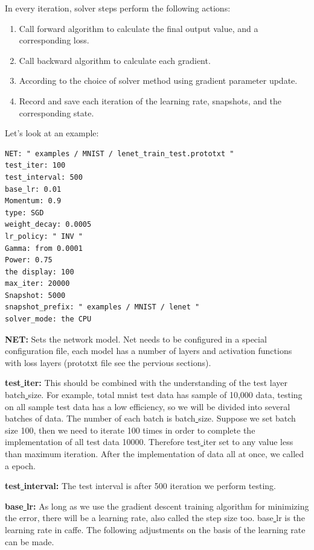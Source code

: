 \documentclass[12pt]{article}
\begin{document}
\noindent In every iteration, solver steps perform the following actions:
\begin{enumerate}
  \item Call forward algorithm to calculate the final output value, and a corresponding loss.
  \item Call backward algorithm to calculate each gradient.
  \item According to the choice of solver method using gradient parameter update.
  \item Record and save each iteration of the learning rate, snapshots, and the corresponding state.
\end{enumerate}


\noindent Let's look at an example:


\begin{lstlisting}[style=json, frame=single]
NET: " examples / MNIST / lenet_train_test.prototxt "
test_iter: 100
test_interval: 500
base_lr: 0.01
Momentum: 0.9
type: SGD
weight_decay: 0.0005
lr_policy: " INV "
Gamma: from 0.0001
Power: 0.75
the display: 100
max_iter: 20000
Snapshot: 5000
snapshot_prefix: " examples / MNIST / lenet "
solver_mode: the CPU
\end{lstlisting}

\noindent\textbf{NET:} Sets the network model. Net needs to be configured in a special configuration file, each model has a number of layers and activation functions with loss layers (prototxt file see the pervious sections).

\noindent\textbf{test\underline{{ }{ }}iter:} This should be combined with the understanding of the test layer batch\underline{{ }{ }}size. For example, total mnist test data has sample of 10,000 data, testing on all sample test data has a low efficiency, so we will be divided into several batches of data. The number of each batch is batch\underline{{ }{ }}size. Suppose we set batch\underline{{ }{ }}size 100, then we need to iterate 100 times in order to complete the implementation of all test data 10000. Therefore test\underline{{ }{ }}iter set to any value less than maximum iteration. After the implementation of data all at once, we called a epoch.

\noindent\textbf{test\underline{{ }{ }}interval:} The test interval is after 500 iteration we perform testing.

\noindent\textbf{base\underline{{ }{ }}lr:} As long as we use the gradient descent training algorithm for minimizing the error, there will be a learning rate, also called the step size too. base\underline{{ }{ }}lr is the learning rate in caffe. The following adjustments on the basis of the learning rate can be made.
\end{document}
